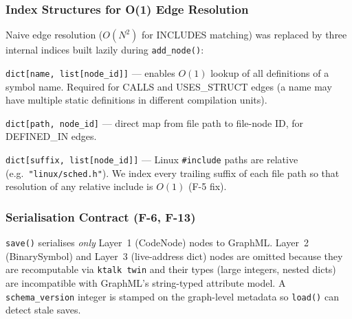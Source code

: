 \documentclass[11pt,a4paper]{article}
\begin{document}
\begin{center}
\end{center}

\subsubsection{Index Structures for O(1) Edge Resolution}

Naive edge resolution ($O(N^2)$ for INCLUDES matching) was replaced by three
internal indices built lazily during \texttt{add\_node()}:

\begin{description}[leftmargin=1.5em, itemsep=2pt]
  \item[\texttt{\_symbol\_index}] \texttt{dict[name, list[node\_id]]} ---
        enables $O(1)$ lookup of all definitions of a symbol name.
        Required for CALLS and USES\_STRUCT edges (a name may have multiple
        static definitions in different compilation units).

  \item[\texttt{\_file\_index}] \texttt{dict[path, node\_id]} ---
        direct map from file path to file-node ID, for DEFINED\_IN edges.

  \item[\texttt{\_includes\_suffix\_index}] \texttt{dict[suffix, list[node\_id]]} ---
        Linux \texttt{\#include} paths are relative (e.g.\ \texttt{"linux/sched.h"}).
        We index every trailing suffix of each file path so that resolution
        of any relative include is $O(1)$ (F-5 fix).
\end{description}

\subsubsection{Serialisation Contract (F-6, F-13)}

\texttt{save()} serialises \emph{only} Layer~1 (CodeNode) nodes to GraphML.
Layer~2 (BinarySymbol) and Layer~3 (live-address dict) nodes are omitted
because they are recomputable via \texttt{ktalk twin} and their types
(large integers, nested dicts) are incompatible with GraphML's string-typed
attribute model. A \texttt{schema\_version} integer is stamped on the
graph-level metadata so \texttt{load()} can detect stale saves.
\end{document}
